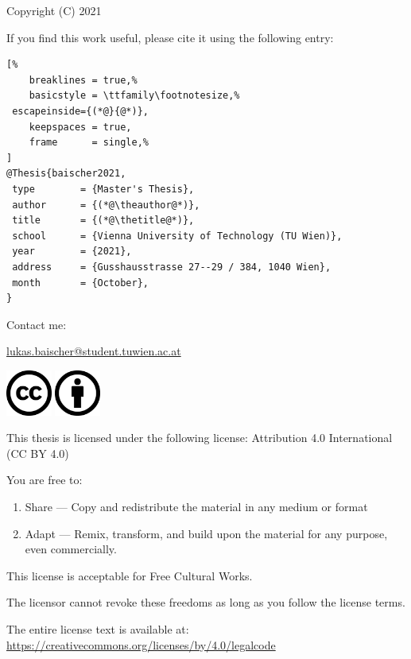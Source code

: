 


Copyright (C) 2021 \theauthor

If you find this work useful, please cite it using the following \BibTeX{ } entry:

\vspace{1em}

\begin{lstlisting}[%
	breaklines = true,%
	basicstyle = \ttfamily\footnotesize,%
 escapeinside={(*@}{@*)},
	keepspaces = true,
	frame      = single,%
]
@Thesis{baischer2021,
 type        = {Master's Thesis},
 author      = {(*@\theauthor@*)},
 title       = {(*@\thetitle@*)},
 school      = {Vienna University of Technology (TU Wien)},
 year        = {2021},
 address     = {Gusshausstrasse 27--29 / 384, 1040 Wien},
 month       = {October},
}
\end{lstlisting}

\vspace{3em}
Contact me:

\href{E-mail address}{lukas.baischer@student.tuwien.ac.at}

\vfill

\includegraphics[height=1.5cm]{fig/cc-large.png}
\includegraphics[height=1.5cm]{fig/by-large.png}


This thesis is licensed under the following license:
Attribution 4.0 International (CC BY 4.0)

\vspace{3em}

You are free to:

\begin{enumerate}
   \item Share --- Copy and redistribute the material in any medium or format
   \item Adapt --- Remix, transform, and build upon the material for any purpose,
			even commercially.
\end{enumerate}

This license is acceptable for Free Cultural Works.

The licensor cannot revoke these freedoms as long as you follow the license terms.

The entire license text is available at:
\href{https://creativecommons.org/licenses/by/4.0/legalcode}
	{https://creativecommons.org/licenses/by/4.0/legalcode}


